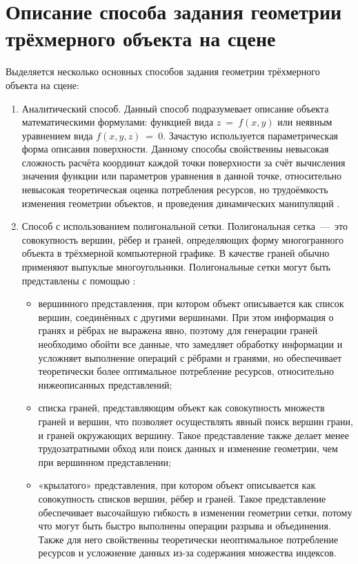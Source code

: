 \section{Описание способа задания геометрии трёхмерного объекта на сцене}
Выделяется несколько основных способов задания геометрии трёхмерного объекта на сцене:
\begin{enumerate}[label={\arabic*)}]
	\item Аналитический способ. Данный способ подразумевает описание объекта математическими формулами: функцией вида $z~=~f(x, y)$ или неявным уравнением вида $f(x, y, z)~=~0$. Зачастую используется параметрическая форма описания поверхности. 
		Данному способы свойственны невысокая сложность расчёта координат каждой точки поверхности за счёт вычисления значения функции или параметров уравнения в данной точке, относительно невысокая теоретическая оценка потребления ресурсов, но трудоёмкость изменения геометрии объектов, и проведения динамических манипуляций \cite{web_item14}.
	\item Способ с использованием полигональной сетки. Полигональная сетка~---~это совокупность вершин, рёбер и граней, определяющих форму многогранного объекта в трёхмерной компьютерной графике. В качестве граней обычно применяют выпуклые многоугольники. Полигональные сетки могут быть представлены с помощью \cite{item15}:
	    \begin{itemize}
	    	\item вершинного представления, при котором объект описывается как список вершин, соединённых с другими вершинами. При этом информация о гранях и рёбрах не выражена явно, поэтому для генерации граней необходимо обойти все данные, что замедляет обработку информации и усложняет выполнение операций с рёбрами и гранями, но обеспечивает теоретически более оптимальное потребление ресурсов, относительно нижеописанных представлений;
	    	\item списка граней, представляющим объект как совокупность множеств граней и вершин, что позволяет осуществлять явный поиск вершин грани, и граней окружающих вершину. Такое представление также делает менее трудозатратными обход или поиск данных и изменение геометрии, чем при вершинном представлении;
	    	\item «крылатого» представления, при котором объект описывается как совокупность списков вершин, рёбер и граней. Такое представление обеспечивает высочайшую гибкость в изменении геометрии сетки, потому что могут быть быстро выполнены операции разрыва и объединения. Также для него свойственны теоретически неоптимальное потребление ресурсов и усложнение данных из-за содержания множества индексов.
	    \end{itemize}
\end{enumerate}

